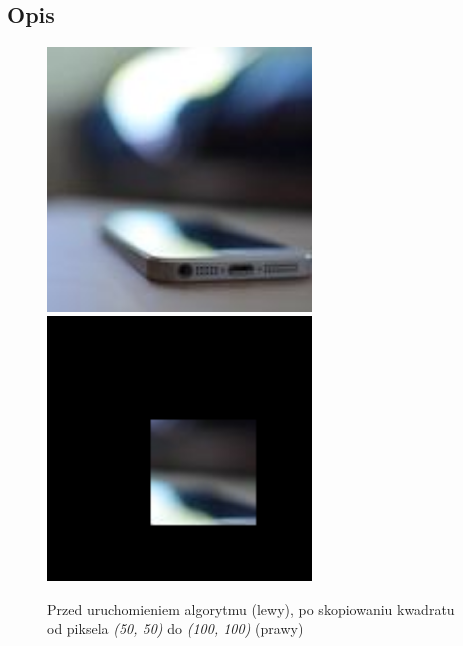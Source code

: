 \documentclass[a4paper,12pt]{book}
\begin{document}
\subsection*{Opis}
\begin{figure}[H]
	\caption{Przed uruchomieniem algorytmu (lewy), po skopiowaniu kwadratu od piksela \textit{(50, 50)} do \textit{(100, 100)} (prawy)}
	\includegraphics[width=7cm, height=7cm]{phone-unmodified.jpg}
	\includegraphics[width=7cm, height=7cm]{4-6/copy-phone.png}
\end{figure}
\end{document}
